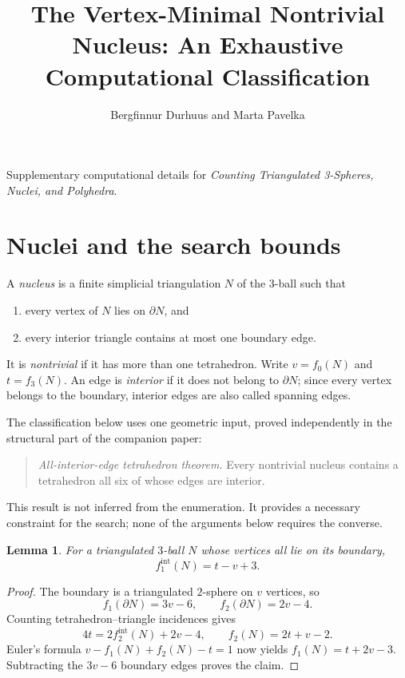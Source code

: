 \documentclass[11pt]{article}
\title{The Vertex-Minimal Nontrivial Nucleus: An Exhaustive Computational Classification}
\author{Bergfinnur Durhuus and Marta Pavelka}
\date{}
\newtheorem{lemma}[theorem]{Lemma}
\begin{document}
\maketitle

\noindent
Supplementary computational details for
\emph{Counting Triangulated 3-Spheres, Nuclei, and Polyhedra}.


\section{Nuclei and the search bounds}

A \emph{nucleus} is a finite simplicial triangulation $N$ of the $3$-ball such that
\begin{enumerate}[label=(\roman*)]
    \item every vertex of $N$ lies on $\partial N$, and
    \item every interior triangle contains at most one boundary edge.
\end{enumerate}
It is \emph{nontrivial} if it has more than one tetrahedron.  Write
$v=f_0(N)$ and $t=f_3(N)$.  An edge is \emph{interior} if it does not
belong to $\partial N$; since every vertex belongs to the boundary, interior
edges are also called spanning edges.

The classification below uses one geometric input, proved independently in
the structural part of the companion paper:
\begin{quote}
\emph{All-interior-edge tetrahedron theorem.} Every nontrivial nucleus
contains a tetrahedron all six of whose edges are interior.
\end{quote}
This result is not inferred from the enumeration.  It provides a necessary
constraint for the search; none of the arguments below requires the converse.

\begin{lemma}\label{lem:interior-edges}
For a triangulated $3$-ball $N$ whose vertices all lie on its boundary,
\[
 f_1^{\mathrm{int}}(N)=t-v+3.
\]
\end{lemma}

\begin{proof}
The boundary is a triangulated $2$-sphere on $v$ vertices, so
\[
 f_1(\partial N)=3v-6,\qquad f_2(\partial N)=2v-4.
\]
Counting tetrahedron--triangle incidences gives
\[
 4t=2f_2^{\mathrm{int}}(N)+2v-4,
 \qquad f_2(N)=2t+v-2.
\]
Euler's formula $v-f_1(N)+f_2(N)-t=1$ now yields
$f_1(N)=t+2v-3$.  Subtracting the $3v-6$ boundary edges proves the claim.
\end{proof}
\end{document}
